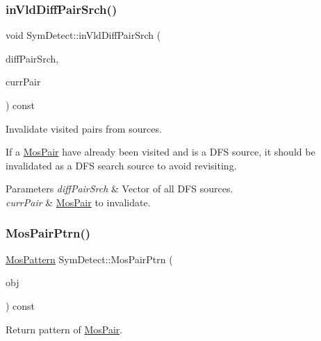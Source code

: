 \subsubsection{\texorpdfstring{in\+Vld\+Diff\+Pair\+Srch()}{inVldDiffPairSrch()}}
{\footnotesize\ttfamily void Sym\+Detect\+::in\+Vld\+Diff\+Pair\+Srch (\begin{DoxyParamCaption}\item[{std\+::vector$<$ \hyperlink{classMosPair}{Mos\+Pair} $>$ \&}]{diff\+Pair\+Srch,  }\item[{\hyperlink{classMosPair}{Mos\+Pair} \&}]{curr\+Pair }\end{DoxyParamCaption}) const\hspace{0.3cm}{\ttfamily [private]}}



Invalidate visited pairs from sources. 

If a \hyperlink{classMosPair}{Mos\+Pair} have already been visited and is a D\+FS source, it should be invalidated as a D\+FS search source to avoid revisiting.


\begin{DoxyParams}{Parameters}
{\em diff\+Pair\+Srch} & Vector of all D\+FS sources. \\
\hline
{\em curr\+Pair} & \hyperlink{classMosPair}{Mos\+Pair} to invalidate. \\
\hline
\end{DoxyParams}
\mbox{\label{classSymDetect_aa832e51051f0ed9d3643c72b1d738684}} 
\subsubsection{\texorpdfstring{Mos\+Pair\+Ptrn()}{MosPairPtrn()}}
{\footnotesize\ttfamily \hyperlink{type_8h_af19eddb079bfea723256710b029c38e8}{Mos\+Pattern} Sym\+Detect\+::\+Mos\+Pair\+Ptrn (\begin{DoxyParamCaption}\item[{\hyperlink{classMosPair}{Mos\+Pair} \&}]{obj }\end{DoxyParamCaption}) const\hspace{0.3cm}{\ttfamily [private]}}



Return pattern of \hyperlink{classMosPair}{Mos\+Pair}. 

\mbox{\label{classSymDetect_a3e0354c4c11fe698377a4688c52fd533}} 
